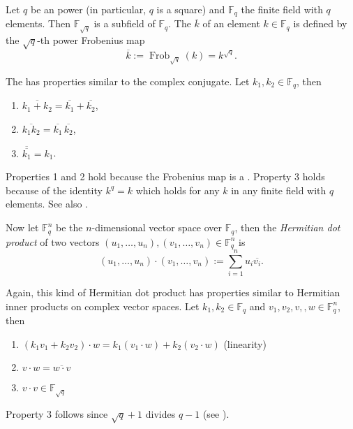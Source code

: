 \documentclass[12pt]{article}
\newcommand{\Sum}{\sum\limits}
\newcommand{\mbb}{\mathbb}
\newcommand{\ol}{\overline}
\DeclareMathOperator{\Frob}{Frob}
\begin{document}
Let $q$ be an   power (in particular, $q$ is a square) and
$\mbb{F}_q$ the finite field with $q$ elements. Then
$\mbb{F}_{\sqrt{q}}$ is a subfield of $\mbb{F}_q$. The
\emph{} $\ol{k}$ of an element $k\in\mbb{F}_q$ is defined by
the
$\sqrt{q}$-th power Frobenius map
\begin{equation*}
\ol{k}:=\Frob_{\sqrt{q}}(k)=k^{\sqrt{q}}.
\end{equation*}

The  has properties similar to the complex conjugate. Let
$k_1,k_2\in\mbb{F}_q$, then
\begin{enumerate}
\item $\ol{k_1+k_2}=\ol{k_1}+\ol{k_2}$,
\item $\ol{k_1k_2}=\ol{k_1}\,\ol{k_2}$,
\item $\ol{\ol{k_1}}=k_1$.
\end{enumerate}
Properties 1 and 2 hold because the Frobenius map is a
.
Property 3 holds because of the identity $k^q=k$ which
holds for any $k$ in any finite field with $q$ elements.
See also \emph{}.

Now let $\mbb{F}_q^n$ be the $n$-dimensional vector space over
$\mbb{F}_q$, then the \emph{Hermitian dot product} of two vectors
$(u_1,\ldots,u_n),(v_1,\ldots,v_n)\in\mbb{F}_q^n$ is
\begin{equation*}
(u_1,\ldots,u_n)\cdot(v_1,\ldots,v_n):=\Sum_{i=1}^nu_i\ol{v_i}.
\end{equation*}

Again, this kind of Hermitian dot product has properties similar to
Hermitian inner products on complex vector spaces. Let
$k_1,k_2\in\mbb{F}_q$ and $v_1,v_2,v,,w\in\mbb{F}_q^n$, then
\begin{enumerate}
\item $(k_1v_1+k_2v_2)\cdot w=k_1(v_1\cdot w)+k_2(v_2\cdot w)$
  (linearity)
\item $v\cdot w=\ol{w\cdot v}$
\item $v\cdot v\in\mbb{F}_{\sqrt{q}}$
\end{enumerate}
Property 3 follows since $\sqrt{q}+1$ divides $q-1$ (see \emph{}).
\end{document}
